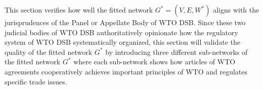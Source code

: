 This section verifies
how well the fitted network $G^* = (V, E, W^*)$
aligns with the jurisprudences of the Panel or Appellate Body of WTO DSB.
Since these two judicial bodies of WTO DSB authoritatively
opinionate how the regulatory system of WTO DSB systematically organized,
this section will validate the quality of the fitted network $G^*$ by
introducing three different sub-networks of
the fitted network $G^*$ where each sub-network shows how articles of WTO agreements
cooperatively achieves important principles of WTO and regulates specific trade issues.
 
 
 


